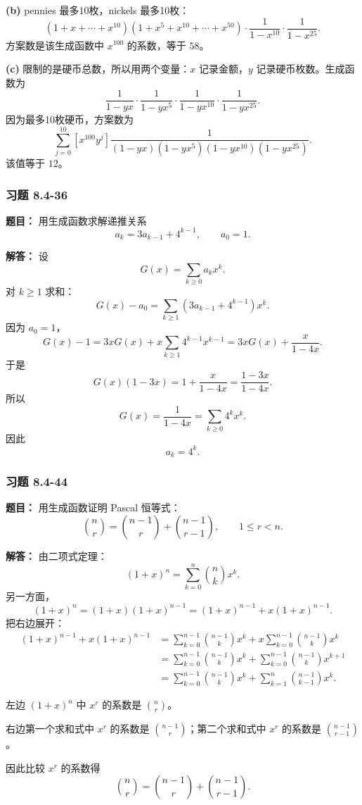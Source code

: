 \documentclass[11pt,UTF8]{article}
\begin{document}
\textbf{(b)} pennies 最多10枚，nickels 最多10枚：
\[ (1+x+\cdots+x^{10})(1+x^5+x^{10}+\cdots+x^{50})\cdot\frac{1}{1-x^{10}}\cdot\frac{1}{1-x^{25}}. \]
方案数是该生成函数中 $x^{100}$ 的系数，等于 $\boxed{58}$。

\textbf{(c)} 限制的是硬币总数，所以用两个变量：$x$ 记录金额，$y$ 记录硬币枚数。生成函数为
\[ \frac{1}{1-yx}\cdot\frac{1}{1-yx^5}\cdot\frac{1}{1-yx^{10}}\cdot\frac{1}{1-yx^{25}}. \]
因为最多10枚硬币，方案数为
\[ \sum_{j=0}^{10}[x^{100}y^j]\frac{1}{(1-yx)(1-yx^5)(1-yx^{10})(1-yx^{25})}. \]
该值等于 $\boxed{12}$。

\subsubsection*{习题 8.4-36}
\textbf{题目：} 用生成函数求解递推关系
\[ a_k=3a_{k-1}+4^{k-1},\qquad a_0=1. \]

\textbf{解答：} 设
\[ G(x)=\sum_{k\ge 0}a_kx^k. \]
对 $k\ge 1$ 求和：
\[ G(x)-a_0=\sum_{k\ge 1}(3a_{k-1}+4^{k-1})x^k. \]
因为 $a_0=1$，
\[ G(x)-1=3xG(x)+x\sum_{k\ge 1}4^{k-1}x^{k-1}=3xG(x)+\frac{x}{1-4x}. \]
于是
\[ G(x)(1-3x)=1+\frac{x}{1-4x}=\frac{1-3x}{1-4x}. \]
所以
\[ G(x)=\frac{1}{1-4x}=\sum_{k\ge 0}4^kx^k. \]
因此
\[ \boxed{a_k=4^k.} \]

\subsubsection*{习题 8.4-44}
\textbf{题目：} 用生成函数证明 Pascal 恒等式：
\[ \binom{n}{r}=\binom{n-1}{r}+\binom{n-1}{r-1},\qquad 1\le r<n. \]

\textbf{解答：} 由二项式定理：
\[ (1+x)^n=\sum_{k=0}^{n}\binom{n}{k}x^k. \]
另一方面，
\[ (1+x)^n=(1+x)(1+x)^{n-1}=(1+x)^{n-1}+x(1+x)^{n-1}. \]
把右边展开：
\begin{align*}
(1+x)^{n-1}+x(1+x)^{n-1} &= \sum_{k=0}^{n-1}\binom{n-1}{k}x^k+x\sum_{k=0}^{n-1}\binom{n-1}{k}x^k\\
&= \sum_{k=0}^{n-1}\binom{n-1}{k}x^k+\sum_{k=0}^{n-1}\binom{n-1}{k}x^{k+1}\\
&= \sum_{k=0}^{n-1}\binom{n-1}{k}x^k+\sum_{k=1}^{n}\binom{n-1}{k-1}x^k.
\end{align*}

左边 $(1+x)^n$ 中 $x^r$ 的系数是 $\displaystyle\binom{n}{r}$。

右边第一个求和式中 $x^r$ 的系数是 $\displaystyle\binom{n-1}{r}$；第二个求和式中 $x^r$ 的系数是 $\displaystyle\binom{n-1}{r-1}$。

因此比较 $x^r$ 的系数得
\[ \boxed{\binom{n}{r}=\binom{n-1}{r}+\binom{n-1}{r-1}.} \]
\end{document}
